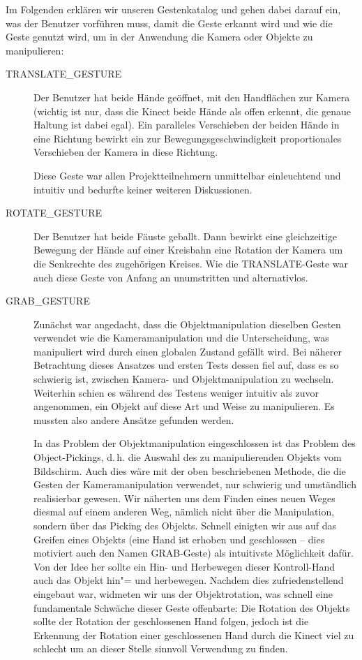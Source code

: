 	Im Folgenden erklären wir unseren Gestenkatalog und gehen dabei darauf ein, was der Benutzer vorführen muss, damit die Geste erkannt wird und wie die Geste genutzt wird, um in der Anwendung die Kamera oder Objekte zu manipulieren:
	\begin{description}
		\item[TRANSLATE\_GESTURE]
		Der Benutzer hat beide Hände geöffnet, mit den Handflächen zur Kamera (wichtig ist nur, dass die Kinect beide Hände als offen erkennt, die genaue Haltung ist dabei egal). Ein paralleles Verschieben der beiden Hände in eine Richtung bewirkt ein zur Bewegungsgeschwindigkeit proportionales Verschieben der Kamera in diese Richtung.\par 
		Diese Geste war allen Projektteilnehmern unmittelbar einleuchtend und intuitiv und bedurfte keiner weiteren Diskussionen.
		\item[ROTATE\_GESTURE] Der Benutzer hat beide Fäuste geballt. Dann bewirkt eine gleichzeitige Bewegung der Hände auf einer Kreisbahn eine Rotation der Kamera um die Senkrechte des zugehörigen Kreises.
		Wie die TRANSLATE-Geste war auch diese Geste von Anfang an unumstritten und alternativlos.
		\item[GRAB\_GESTURE] Zunächst war angedacht, dass die Objektmanipulation dieselben Gesten verwendet wie die Kameramanipulation und die Unterscheidung, was manipuliert wird durch einen globalen Zustand gefällt wird. Bei näherer Betrachtung dieses Ansatzes und ersten Tests dessen fiel auf, dass es so schwierig ist, zwischen Kamera- und Objektmanipulation zu wechseln. Weiterhin schien es während des Testens weniger intuitiv als zuvor angenommen, ein Objekt auf diese Art und Weise zu manipulieren. Es mussten also andere Ansätze gefunden werden.\par 
		In das Problem der Objektmanipulation eingeschlossen ist das Problem des Object-Pickings, d.\,h. die Auswahl des zu manipulierenden Objekts vom Bildschirm. Auch dies wäre mit der oben beschriebenen Methode, die die Gesten der Kameramanipulation verwendet, nur schwierig und umständlich realisierbar gewesen. Wir näherten uns dem Finden eines neuen Weges diesmal auf einem anderen Weg, nämlich nicht über die Manipulation, sondern über das Picking des Objekts. Schnell einigten wir aus auf das Greifen eines Objekts (eine Hand ist erhoben und geschlossen -- dies motiviert auch den Namen \glqq GRAB\grqq-Geste) als intuitivste Möglichkeit dafür. Von der Idee her sollte ein Hin- und Herbewegen dieser \glqq Kontroll-Hand\grqq{} auch das Objekt hin"= und herbewegen. Nachdem dies zufriedenstellend eingebaut war, widmeten wir uns der Objektrotation, was schnell eine fundamentale Schwäche dieser Geste offenbarte: Die Rotation des Objekts sollte der Rotation der geschlossenen Hand folgen, jedoch ist die Erkennung der Rotation einer geschlossenen Hand durch die Kinect viel zu schlecht um an dieser Stelle sinnvoll Verwendung zu finden.\par 

\end{description}
